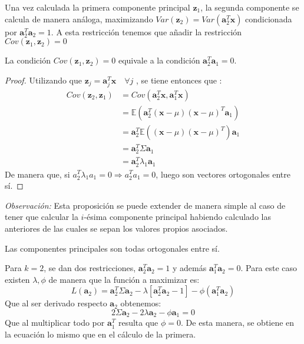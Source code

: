 \noindent Una vez calculada la primera componente principal $\textbf{z}_1$, la segunda componente se calcula de manera análoga, maximizando $Var(\textbf{z}_2)=Var(\textbf{a}_2^T\textbf{x})$ condicionada por $\textbf{a}_2^T\textbf{a}_2=1$. A esta restricción tenemos que añadir la restricción $Cov(\textbf{z}_1,\textbf{z}_2)=0 $

\begin{propo}
La condición $Cov(\textbf{z}_1,\textbf{z}_2)=0 $ equivale a la condición $\textbf{a}_2^T\textbf{a}_1 = 0$.
\begin{proof}
Utilizando que $\textbf{z}_j=\textbf{a}_j^T \textbf{x}\quad \forall j$ , se tiene entonces que :
\begin{align*}
Cov(\textbf{z}_2,\textbf{z}_1)&= Cov (\textbf{a}_2^T\textbf{x},\textbf{a}_1^T\textbf{x})\\ 
&= \mathbb{E}(\textbf{a}_2^T(\textbf{x}-\mu)(\textbf{x}-\mu)^T \textbf{a}_1)\\
&= \textbf{a}_2^T \mathbb{E}((\textbf{x}-\mu)(\textbf{x}-\mu)^T) \textbf{a}_1\\
&= \textbf{a}_2^T \Sigma \textbf{a}_1 \\
&= \textbf{a}_2^T \lambda_1 \textbf{a}_1
\end{align*}
\noindent De manera que, si $a_2^T \lambda_1 a_1 = 0 \Rightarrow a_2^T a_1=0 $, luego son vectores ortogonales entre sí.
\end{proof}
\end{propo}


\noindent \emph{Observación: } Esta proposición se puede extender de manera simple al caso de tener que calcular la $i$-ésima componente principal habiendo calculado las anteriores de las cuales se sepan los valores propios asociados. 

\begin{coro}
Las componentes principales son todas ortogonales entre sí. 
\end{coro}

\noindent Para $k=2$, se dan dos restricciones, $\textbf{a}_2^T\textbf{a}_2=1$ y además $\textbf{a}_1^T \textbf{a}_2=0$. Para este caso existen $\lambda, \phi$ de manera que la función a maximizar es:
\begin{equation}
 L(\textbf{a}_2)=\textbf{a}_2^T \Sigma \textbf{a}_2 - \lambda[\textbf{a}_2^T \textbf{a}_2-1]-\phi(\textbf{a}_1^T \textbf{a}_2)
\end{equation}
Que al ser derivado respecto $\textbf{a}_2$ obtenemos:
\begin{equation}
2\Sigma \textbf{a}_2 - 2\lambda\textbf{a}_2-\phi \textbf{a}_1=0
\end{equation}
Que al multiplicar todo por $\textbf{a}_1^T$ resulta que $\phi=0$. De esta manera, se obtiene en la ecuación lo mismo que en el cálculo de la primera. 

